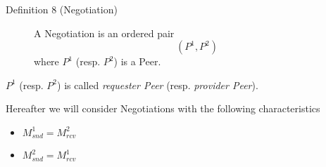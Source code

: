 \documentclass{article}
\begin{document}
\begin{description}
\item[Definition 8 (Negotiation)] A Negotiation is an ordered pair
  \begin{displaymath}
  (P^{1}, P^{2})
  \end{displaymath}
  where $P^{1}$ (resp. $P^{2}$) is a Peer.
\end{description}

$P^{1}$ (resp. $P^{2}$) is called \textit{requester Peer} (resp. \textit{provider Peer}).

Hereafter we will consider Negotiations with the following characteristics

\begin{itemize}
\item $M_{snd}^{1} = M_{rcv}^{2}$
\item $M_{snd}^{2} = M_{rcv}^{1}$
\end{itemize}
\end{document}
